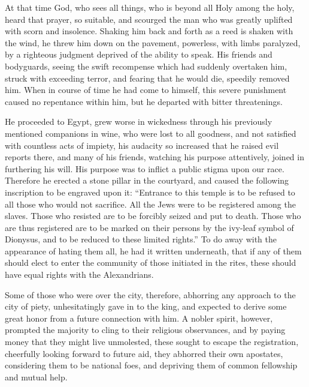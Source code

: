  At that time God, who sees all things, who is beyond all
Holy among the holy, heard that prayer, so suitable, and scourged the
man who was greatly uplifted with scorn and insolence. 
Shaking him back and forth as a reed is shaken with the wind, he threw
him down on the pavement, powerless, with limbs paralyzed, by a
righteous judgment deprived of the ability to speak.  His
friends and bodyguards, seeing the swift recompense which had suddenly
overtaken him, struck with exceeding terror, and fearing that he would
die, speedily removed him.  When in course of time he had
come to himself, this severe punishment caused no repentance within him,
but he departed with bitter threatenings.

 He proceeded to Egypt, grew worse in wickedness through
his previously mentioned companions in wine, who were lost to all
goodness,  and not satisfied with countless acts of
impiety, his audacity so increased that he raised evil reports there,
and many of his friends, watching his purpose attentively, joined in
furthering his will.  His purpose was to inflict a public
stigma upon our race. Therefore he erected a stone pillar in the
courtyard, and caused the following inscription to be engraved upon it:
 ``Entrance to this temple is to be refused to all those
who would not sacrifice. All the Jews were to be registered among the
slaves. Those who resisted are to be forcibly seized and put to death.
 Those who are thus registered are to be marked on their
persons by the ivy-leaf symbol of Dionysus, and to be reduced to these
limited rights.''  To do away with the appearance of hating
them all, he had it written underneath, that if any of them should elect
to enter the community of those initiated in the rites, these should
have equal rights with the Alexandrians.

 Some of those who were over the city, therefore, abhorring
any approach to the city of piety, unhesitatingly gave in to the king,
and expected to derive some great honor from a future connection with
him.  A nobler spirit, however, prompted the majority to
cling to their religious observances, and by paying money that they
might live unmolested, these sought to escape the registration,
 cheerfully looking forward to future aid, they abhorred
their own apostates, considering them to be national foes, and depriving
them of common fellowship and mutual help.

